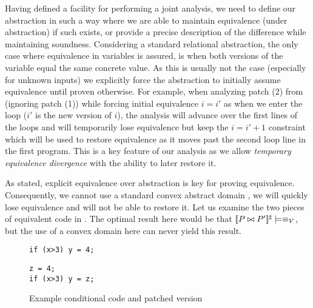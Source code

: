 Having defined a facility for performing a joint analysis, we need to define our abstraction in such a way where we are able to maintain equivalence (under abstraction) if such exists, or provide a precise description of the difference while maintaining soundness. Considering a standard relational abstraction, the only case where equivalence in variables is assured, is when both versions of the variable equal the same concrete value. As this is usually not the case (especially for unknown inputs) we explicitly force the abstraction to initially assume equivalence until proven otherwise. For example, when analyzing patch (2) from  (ignoring patch (1)) while forcing initial equivalence ${i = i'}$ as when we enter the loop ($i'$ is the new version of $i$), the analysis will advance over the first lines of the loops and will temporarily lose equivalence but keep the ${i = i' + 1}$ constraint which will be used to restore equivalence as it moves past the second loop line in the first program. This is a key feature of our analysis as we allow \emph{temporary equivalence divergence} with the ability to later restore it.

As stated, explicit equivalence over abstraction is key for proving equivalence. Consequently, we cannot use a standard convex abstract domain \cite{JeannetMine09}, we will quickly lose equivalence and will not be able to restore it. Let us examine the two pieces of equivalent code in . The optimal result here would be that $\lbrack\!\lbrack P \bowtie P' \rbrack\!\rbrack^{\sharp} \models \equiv_{V}$, but the use of a convex domain here can never yield this result.

\begin{figure}[ht]
\centering
\begin{lstlisting}
if (x>3) y = 4;
\end{lstlisting}
\hspace{0.5cm}
\centering
\begin{lstlisting}
z = 4;
if (x>3) y = z;
\end{lstlisting}
\caption{Example conditional code and patched version}
\end{figure}


